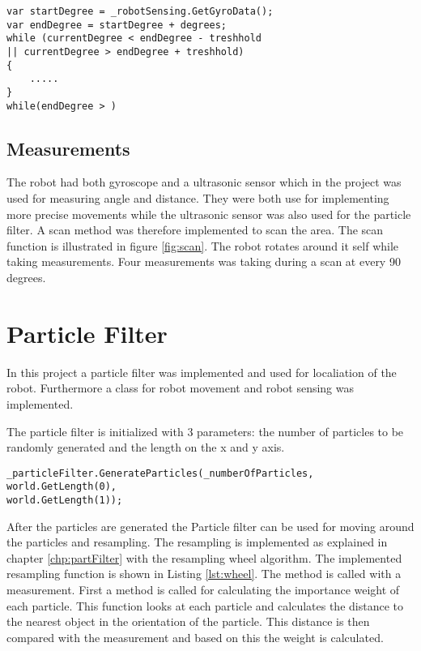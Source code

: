 \lstset{style=sharpc}
\begin{lstlisting}[caption={Pseduo code for turning the robot}, label=lst:turn, mathescape=true]             
var startDegree = _robotSensing.GetGyroData();
var endDegree = startDegree + degrees;
while (currentDegree < endDegree - treshhold 
|| currentDegree > endDegree + treshhold)
{	
	.....
}
while(endDegree > )
\end{lstlisting}


\FloatBarrier
\subsection{Measurements}
The robot had both gyroscope and a ultrasonic sensor which in the project was used for measuring angle and distance. They were both use for implementing more precise movements while the ultrasonic sensor was also used for the particle filter. A scan method was therefore implemented to scan the area. The scan function is illustrated in figure \ref{fig:scan}. The robot rotates around it self while taking measurements. Four measurements was taking during a scan at every 90 degrees.


\FloatBarrier
\section{Particle Filter}
In this project a particle filter was implemented and used for localiation of the robot. Furthermore a class for robot movement and robot sensing was implemented. 

The particle filter is initialized with 3 parameters: the number of particles to be randomly generated and the length on the x and y axis.

\lstset{style=sharpc}
\begin{lstlisting}[caption={Initialization of the particle filter}, label=lst:initPart, mathescape=true]             
_particleFilter.GenerateParticles(_numberOfParticles, world.GetLength(0),
world.GetLength(1));
\end{lstlisting}

After the particles are generated the Particle filter can be used for moving around the particles and resampling. The resampling is implemented as explained in chapter \ref{chp:partFilter} with the resampling wheel algorithm. The implemented resampling function is shown in Listing \ref{lst:wheel}. The method is called with a measurement. First a method is called for calculating the importance weight of each particle. This function looks at each particle and calculates the distance to the nearest object in the orientation of the particle. This distance is then compared with the measurement and based on this the weight is calculated.

